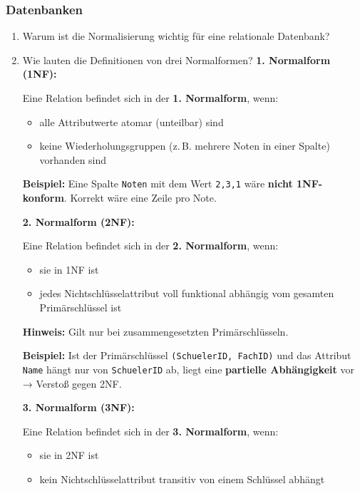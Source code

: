 \documentclass[a4paper,12pt]{article}
\begin{document}
		\subsubsection*{Datenbanken}
		\begin{enumerate}
		\item Warum ist die Normalisierung wichtig für eine relationale Datenbank?
		\item Wie lauten die Definitionen von drei Normalformen?
					\textbf{1. Normalform (1NF):}
		
		Eine Relation befindet sich in der \textbf{1. Normalform}, wenn:
		\begin{itemize}
			\item alle Attributwerte atomar (unteilbar) sind
			\item keine Wiederholungsgruppen (z.\,B. mehrere Noten in einer Spalte) vorhanden sind
		\end{itemize}
		
		\textbf{Beispiel:}  
		Eine Spalte \texttt{Noten} mit dem Wert \texttt{2,3,1} wäre \textbf{nicht 1NF-konform}.  
		Korrekt wäre eine Zeile pro Note.
		
		\vspace{1em}
		
		\textbf{2. Normalform (2NF):}
		
		Eine Relation befindet sich in der \textbf{2. Normalform}, wenn:
		\begin{itemize}
			\item sie in 1NF ist
			\item jedes Nichtschlüsselattribut voll funktional abhängig vom gesamten Primärschlüssel ist
		\end{itemize}
		
		\textbf{Hinweis:} Gilt nur bei zusammengesetzten Primärschlüsseln.
		
		\textbf{Beispiel:}  
		Ist der Primärschlüssel \texttt{(SchuelerID, FachID)} und das Attribut \texttt{Name} hängt nur von \texttt{SchuelerID} ab, liegt eine \textbf{partielle Abhängigkeit} vor → Verstoß gegen 2NF.
		
		\vspace{1em}
		
		\textbf{3. Normalform (3NF):}
		
		Eine Relation befindet sich in der \textbf{3. Normalform}, wenn:
		\begin{itemize}
			\item sie in 2NF ist
			\item kein Nichtschlüsselattribut transitiv von einem Schlüssel abhängt
		\end{itemize}
		

\end{enumerate}
\end{document}
